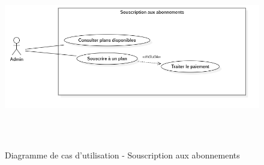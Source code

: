 \begin{figure}[H]
    \centering
    \includegraphics[width=12cm,height=8cm]{images/subscribeuc.png}
    \caption{Diagramme de cas d'utilisation - Souscription aux abonnements}
\end{figure}
\vspace{\baselineskip} 
\vspace{\baselineskip} 
